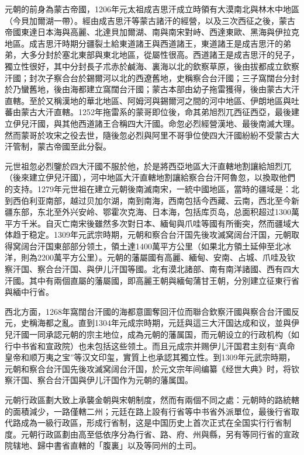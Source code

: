 元朝的前身為蒙古帝國，1206年元太祖成吉思汗成立時領有大漠南北與林木中地區（今貝加爾湖一帶）。經由成吉思汗等蒙古諸汗的經營，以及三次西征之後，蒙古帝國東達日本海與高麗、北達貝加爾湖、南與南宋對峙、西達東歐、黑海與伊拉克地區。成吉思汗時期分疆裂土給東道諸王與西道諸王，東道諸王是成吉思汗的弟弟，大多分封於塞北東部與東北地區，從屬性很高。西道諸王是成吉思汗的兒子，獨立性很好，其中分封長子朮赤於鹹海、裏海以北的欽察草原，後由拔都成立欽察汗國；封次子察合台於錫爾河以北的西遼舊地，史稱察合台汗國；三子窩闊台分封於乃蠻舊地，後由海都建立窩闊台汗國；蒙古本部由幼子拖雷獲得，後由蒙古大汗直轄。至於又稱漢地的華北地區、阿姆河與錫爾河之間的河中地區、伊朗地區與吐蕃由蒙古大汗直轄。1252年拖雷系的蒙哥即位後，命其弟旭烈兀西征西亞，最後建立伊兒汗國，與其他西道諸王合稱四大汗國。命忽必烈經營漢地、最後南滅大理。然而蒙哥於攻宋之役去世，隨後忽必烈與阿里不哥爭位使四大汗國紛紛不受蒙古大汗管制，蒙古帝國至此分裂。

元世祖忽必烈鑒於四大汗國不服於他，於是將西亞地區大汗直轄地割讓給旭烈兀（後來建立伊兒汗國），河中地區大汗直轄地割讓給察合台汗阿魯忽，以換取他們的支持。1279年元世祖在建立元朝後南滅南宋，一統中國地區，當時的疆域是：北到西伯利亚南部，越过贝加尔湖，南到南海，西南包括今西藏、云南，西北至今新疆东部，东北至外兴安岭、鄂霍次克海、日本海，包括库页岛，总面积超过1300萬平方千米。自灭亡南宋後雖然多次對日本、緬甸與爪哇等國有所衝突，然而疆域大体趋于稳定。1309年元武宗時期，元朝和察合台汗国先後攻滅窝阔台汗国，元朝取得窝阔台汗国東部部分领土，領土達1400萬平方公里（如果北方領土延伸至北冰洋，則為2200萬平方公里）。元朝的藩屬國有高麗、緬甸、安南、占城、爪哇及钦察汗国、察合台汗国、與伊儿汗国等國。北有漠北諸部、南有南洋諸國、西有四大汗國。其中有兩個直屬的藩屬國，即高麗王朝與緬甸蒲甘王朝，分別建立征東行省與緬中行省。

西北方面，1268年窩闊台汗國的海都意圖奪回汗位而聯合欽察汗國與察合台汗國反元，史稱海都之亂。直到1304年元成宗時期，元廷與這三大汗国达成和议，並與伊兒汗國一同承認元朝的宗主地位，成為元朝的藩属国，而元朝设立的行政机构（如行中书省和宣政院）也未包括这些领土。而且元成宗并赐伊儿汗国君主刻有“真命皇帝和顺万夷之宝”等汉文印玺，實質上也承認其獨立性。到1309年元武宗時期，元朝和察合台汗国先後攻滅窝阔台汗国，於元文宗年间编纂《经世大典》时，将钦察汗国、察合台汗国與伊儿汗国作为元朝的藩属国。

元朝行政區劃大致上承襲金朝與宋朝制度，然而有兩個不同之處：元朝時的路統轄的面積減少，一路僅轄二州；元廷在路上設有行省等中书省外派單位，最後行省取代路成為一級行政區，形成行省制，这是中国历史上首次正式在全国实行行省制度。元朝行政區劃由高至低依序分為行省、路、府、州與縣，另有等同行省的宣政院辖地、歸中書省直轄的「腹裏」以及等同州的土司。

